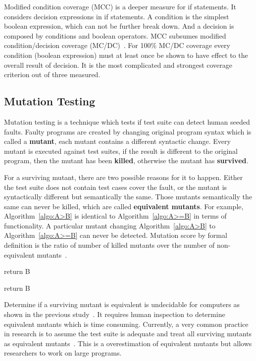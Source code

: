 Modified condition coverage (MCC) is a deeper measure for if statements. It considers decision expressions in if statements. A condition is the simplest boolean expression, which can not be further break down. And a decision is composed by conditions and boolean operators. MCC subsumes modified condition/decision coverage (MC/DC)~\cite{hayhurst2001practical}. For 100\% MC/DC coverage every condition (boolean expression) must at least once be shown to have effect to the overall result of decision. It is the most complicated and strongest coverage criterion out of three measured.

\subsection{Mutation Testing}
Mutation testing is a technique which tests if test suite can detect human seeded faults. Faulty programs are created by changing original program syntax which is called a \textbf{mutant}, each mutant contains a different syntactic change. Every mutant is executed against test suites, if the result is different to the original program, then the mutant has been \textbf{killed}, otherwise the mutant has \textbf{survived}.

For a surviving mutant, there are two possible reasons for it to happen. Either the test suite does not contain test cases cover the fault, or the mutant is syntactically different but semantically the same. Those mutants semantically the same can never be killed, which are called \textbf{equivalent mutants}. For example, Algorithm~\ref{algo:A>B} is identical to Algorithm~\ref{algo:A>=B} in terms of functionality. A particular mutant changing Algorithm~\ref{algo:A>B} to Algorithm~\ref{algo:A>=B} can never be detected. Mutation score by formal definition is the ratio of number of killed mutants over the number of non-equivalent mutants~\cite{jia2011analysis}. 

\begin{algorithm}[h]
	{return B\;
	}
	\caption{Return the number with highest value}
	\label{algo:A>B}
	\bigskip
\end{algorithm}

\begin{algorithm}[h]
	{
		return B\;
	}
	\caption{Return the number with highest value}
	\label{algo:A>=B}
	\bigskip
\end{algorithm}

Determine if a surviving mutant is equivalent is undecidable for computers as shown in the previous study~\cite{budd1982two}. It requires human inspection to determine equivalent mutants which is time consuming. Currently, a very common practice in research is to assume the test suite is adequate and treat all surviving mutants as equivalent mutants~\cite{jia2011analysis}. This is a overestimation of equivalent mutants but allows researchers to work on large programs.